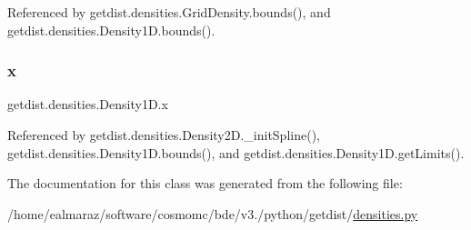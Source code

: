 Referenced by getdist.\+densities.\+Grid\+Density.\+bounds(), and getdist.\+densities.\+Density1\+D.\+bounds().

\mbox{\label{classgetdist_1_1densities_1_1Density1D_afedbcf5fb7976fb479333f3f261fb70b}} 
\subsubsection{\texorpdfstring{x}{x}}
{\footnotesize\ttfamily getdist.\+densities.\+Density1\+D.\+x}



Referenced by getdist.\+densities.\+Density2\+D.\+\_\+init\+Spline(), getdist.\+densities.\+Density1\+D.\+bounds(), and getdist.\+densities.\+Density1\+D.\+get\+Limits().



The documentation for this class was generated from the following file\+:\begin{DoxyCompactItemize}
\item 
/home/ealmaraz/software/cosmomc/bde/v3./python/getdist/\mbox{\hyperlink{densities_8py}{densities.\+py}}\end{DoxyCompactItemize}
